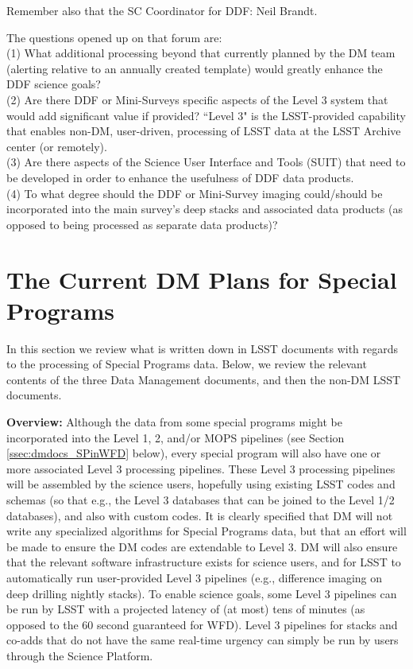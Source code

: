 \documentclass[DM,lsstdraft,toc]{lsstdoc}
\begin{document}
\noindent Remember also that the SC Coordinator for DDF: Neil Brandt.

\noindent The questions opened up on that forum are: \\
(1) What additional processing beyond that currently planned by the DM team (alerting relative to an annually created template) would greatly enhance the DDF science goals? \\
(2) Are there DDF or Mini-Surveys specific aspects of the Level 3 system that would add significant value if provided? ``Level 3" is the LSST-provided capability that enables non-DM, user-driven, processing of LSST data at the LSST Archive center (or remotely). \\
(3) Are there aspects of the Science User Interface and Tools (SUIT) that need to be developed in order to enhance the usefulness of DDF data products. \\
(4) To what degree should the DDF or Mini-Survey imaging could/should be incorporated into the main survey's deep stacks and associated data products (as opposed to being processed as separate data products)?



\clearpage
\section{The Current DM Plans for Special Programs} \label{sec:dmdocs}

In this section we review what is written down in LSST documents with regards to the processing of Special Programs data. Below, we review the relevant contents of the three Data Management documents, and then the non-DM LSST documents. 

\textbf{Overview:} Although the data from some special programs might be incorporated into the Level 1, 2, and/or MOPS pipelines (see Section \ref{ssec:dmdocs_SPinWFD} below), every special program will also have one or more associated Level 3 processing pipelines. These Level 3 processing pipelines will be assembled by the science users, hopefully using existing LSST codes and schemas (so that e.g., the Level 3 databases that can be joined to the Level 1/2 databases), and also with custom codes. It is clearly specified that DM will not write any specialized algorithms for Special Programs data, but that an effort will be made to ensure the DM codes are extendable to Level 3. DM will also ensure that the relevant software infrastructure exists for science users, and for LSST to automatically run user-provided Level 3 pipelines (e.g., difference imaging on deep drilling nightly stacks). To enable science goals, some Level 3 pipelines can be run by LSST with a projected latency of (at most) tens of minutes (as opposed to the 60 second guaranteed for WFD). Level 3 pipelines for stacks and co-adds that do not have the same real-time urgency can simply be run by users through the Science Platform. 
\end{document}
